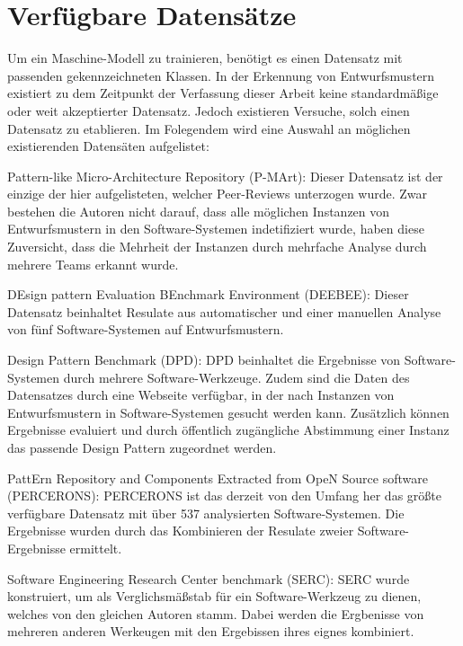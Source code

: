 \section{Verfügbare Datensätze}\label{dataset}
Um ein Maschine-Modell zu trainieren, benötigt es einen Datensatz mit passenden gekennzeichneten Klassen.
In der Erkennung von Entwurfsmustern existiert zu dem Zeitpunkt der Verfassung dieser Arbeit keine standardmäßige oder weit akzeptierter Datensatz.
Jedoch existieren Versuche, solch einen Datensatz zu etablieren. Im Folegendem wird eine Auswahl an möglichen existierenden Datensäten aufgelistet:

\begin{description}
    \item Pattern-like Micro-Architecture Repository (P-MArt): Dieser Datensatz ist der einzige der hier aufgelisteten, welcher Peer-Reviews unterzogen wurde. Zwar bestehen die Autoren nicht darauf, dass alle möglichen Instanzen von Entwurfsmustern in den Software-Systemen indetifiziert wurde, haben diese Zuversicht, dass die Mehrheit der Instanzen durch mehrfache Analyse durch mehrere Teams erkannt wurde. 
    \item DEsign pattern Evaluation BEnchmark Environment (DEEBEE): Dieser Datensatz beinhaltet Resulate aus automatischer und einer manuellen Analyse von fünf Software-Systemen auf Entwurfsmustern.
    \item Design Pattern Benchmark (DPD): DPD beinhaltet die Ergebnisse von Software-Systemen durch mehrere Software-Werkzeuge. Zudem sind die Daten des Datensatzes durch eine Webseite verfügbar, in der nach Instanzen von Entwurfsmustern in Software-Systemen gesucht werden kann. Zusätzlich können Ergebnisse evaluiert und durch öffentlich zugängliche Abstimmung einer Instanz das passende Design Pattern zugeordnet werden.
    \item PattErn Repository and Components Extracted from OpeN Source software (PERCERONS): PERCERONS ist das derzeit von den Umfang her das größte verfügbare Datensatz mit über 537 analysierten Software-Systemen. Die Ergebnisse wurden durch das Kombinieren der Resulate zweier Software-Ergebnisse ermittelt.
    \item Software Engineering Research Center benchmark (SERC): SERC wurde konstruiert, um als Verglichsmäßstab für ein Software-Werkzeug zu dienen, welches von den gleichen Autoren stamm. Dabei werden die Ergbenisse von mehreren anderen Werkeugen mit den Ergebissen ihres eignes kombiniert.
\end{description}

